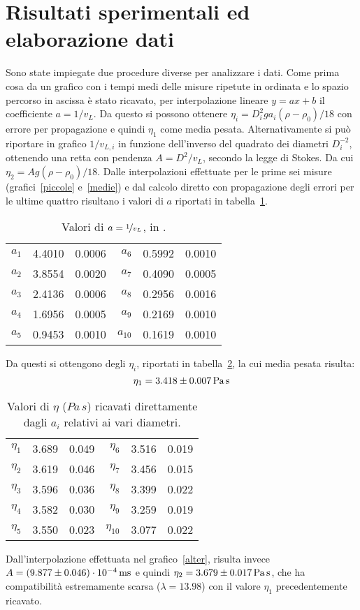 \documentclass[italian,a4paper]{article}
\newcommand{\pas}{\ensuremath{Pa\,s}} %
\begin{document}
\section{Risultati sperimentali ed elaborazione dati}
Sono state impiegate due procedure diverse per analizzare i dati. Come prima cosa da un grafico con i tempi medi delle misure ripetute in ordinata e lo spazio percorso in ascissa  è stato ricavato, per interpolazione lineare $y=ax+b$ il coefficiente $a=1/v_L$. Da questo si possono ottenere $\eta_i=D_i^2ga_i(\rho-\rho_0)/18$ con errore per propagazione e quindi $\eta_1$ come media pesata.
Alternativamente si può riportare in grafico $1/v_{L,i}$ in funzione dell'inverso del quadrato dei diametri $D_i^{-2}$, ottenendo una retta con pendenza $A=D^2/v_L$, secondo la legge di Stokes. Da cui $\eta_2 = Ag(\rho-\rho_0)/18$.
Dalle interpolazioni effettuate per le prime sei misure (grafici~\ref{piccole} e~\ref{medie}) e dal calcolo diretto con propagazione degli errori per le ultime quattro risultano i valori di $a$ riportati in tabella~\ref{a}.
\begin{table}[t]\caption{Valori di $a=\nicefrac{1}{v_L}$, in .}\label{a}\centering
 \begin{tabular}{rr@{$\pm$}l rr@{$\pm$}l}
 $a_1$ & 4.4010&0.0006 &$a_6$ & 0.5992&0.0010\\
 $a_2$ & 3.8554&0.0020&$a_7$ & 0.4090&0.0005\\
 $a_3$ & 2.4136&0.0006&$a_8$ & 0.2956&0.0016\\
 $a_4$ & 1.6956&0.0005&$a_9$ & 0.2169&0.0010\\
 $a_5$ & 0.9453&0.0010&$a_{10}$ & 0.1619&0.0010\\
\end{tabular}
\end{table}
Da questi si ottengono degli $\eta_i$, riportati in tabella~\ref{eta}, la cui media pesata risulta:
\begin{equation*}
 \eta_1 = \unit[3.418\pm0.007]{\pas}
\end{equation*}
\begin{table}[t]\caption{Valori di $\eta$ ($\unit{\pas}$) ricavati direttamente dagli $a_i$ relativi ai vari diametri.}\label{eta}\centering
 \begin{tabular}{rr@{$\pm$}l rr@{$\pm$}l}
$\eta_1$ &3.689 &0.049 &$\eta_6$ &3.516 &0.019\\
$\eta_2$ &3.619 &0.046 &$\eta_7$ &3.456 &0.015\\
$\eta_3$ &3.596 &0.036 &$\eta_8$ &3.399 &0.022\\
$\eta_4$ &3.582 &0.030 &$\eta_{9}$ &3.259 &0.019\\
$\eta_5$ &3.550 &0.023 &$\eta_{10}$ &3.077 &0.022
\end{tabular}
\end{table}
Dall'interpolazione effettuata nel grafico~\ref{alter}, risulta invece $A=\unit[(9.877\pm0.046)\cdot 10^{-4}]{ms}$ e quindi $\eta_2 = \unit[3.679\pm0.017]{\pas}$, che ha compatibilità estremamente scarsa ($\lambda = 13.98$) con il valore $\eta_1$ precedentemente ricavato.
\end{document}
